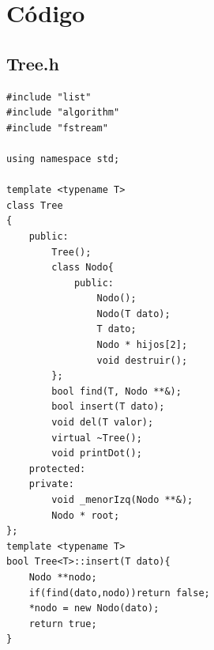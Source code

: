 \documentclass[a4paper,12pt]{article}
\begin{document}
 \section{Código}
 \subsection{Tree.h}
 \begin{lstlisting}
#include "list"
#include "algorithm"
#include "fstream"

using namespace std;

template <typename T>
class Tree
{
    public:
        Tree();
        class Nodo{
            public:
                Nodo();
                Nodo(T dato);
                T dato;
                Nodo * hijos[2];
                void destruir();
        };
        bool find(T, Nodo **&);
        bool insert(T dato);
        void del(T valor);
        virtual ~Tree();
        void printDot();
    protected:
    private:
        void _menorIzq(Nodo **&);
        Nodo * root;
};
template <typename T>
bool Tree<T>::insert(T dato){
    Nodo **nodo;
    if(find(dato,nodo))return false;
    *nodo = new Nodo(dato);
    return true;
}


\end{lstlisting}
\end{document}

